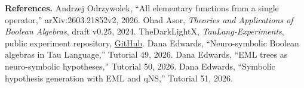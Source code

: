 \documentclass[10pt]{article}
\begin{document}
\footnotesize
\textbf{References.}
Andrzej Odrzywolek, ``All elementary functions from a single operator,''
arXiv:2603.21852v2, 2026.
Ohad Asor, \emph{Theories and Applications of Boolean Algebras}, draft v0.25,
2024.
TheDarkLightX, \emph{TauLang-Experiments}, public experiment repository,
\href{https://github.com/TheDarkLightX/TauLang-Experiments}{GitHub}.
Dana Edwards, ``Neuro-symbolic Boolean algebras in Tau Language,'' Tutorial 49,
2026.
Dana Edwards, ``EML trees as neuro-symbolic hypotheses,'' Tutorial 50, 2026.
Dana Edwards, ``Symbolic hypothesis generation with EML and qNS,'' Tutorial 51,
2026.
\end{document}
